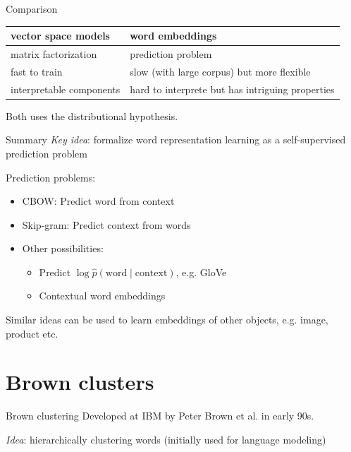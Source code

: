 \documentclass[usenames,dvipsnames,notes]{beamer}
\begin{document}
\begin{frame}
    {Comparison}
    \begin{table}
        \begin{tabular}{p{4cm}p{7cm}}
            vector space models & word embeddings \\
            \midrule
            matrix factorization & prediction problem \\
            fast to train & slow (with large corpus) but more flexible \\
            interpretable components & hard to interprete but has intriguing properties
        \end{tabular}

        Both uses the distributional hypothesis.
    \end{table}
\end{frame}

\begin{frame}
    {Summary}
    \emph{Key idea}: formalize word representation learning as a self-supervised prediction problem

    Prediction problems:\\
    \begin{itemize}
        \item CBOW: Predict word from context
        \item Skip-gram: Predict context from words
        \item Other possibilities:
            \begin{itemize}
                \item Predict $\log \hat{p} (\text{word}\mid \text{context})$, e.g. GloVe
                \item Contextual word embeddings
            \end{itemize}
    \end{itemize}

    Similar ideas can be used to learn embeddings of other objects, e.g. image, product etc.
\end{frame}

\section{Brown clusters}

\begin{frame}
    {Brown clustering}
    Developed at IBM by Peter Brown et al. in early 90s.

    \emph{Idea}: hierarchically clustering words (initially used for language modeling)
    
    \vspace{7em}
\end{frame}
\end{document}
